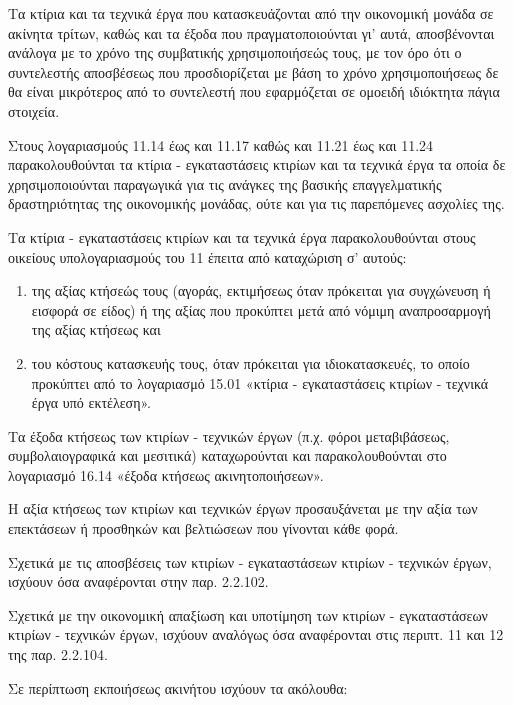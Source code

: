 \documentclass[A4,10pt,greek]{book}
\begin{document}
Τα κτίρια και τα τεχνικά έργα που κατασκευάζονται από την οικονομική μονάδα σε ακίνητα τρίτων, καθώς και τα έξοδα που πραγματοποιούνται γι' αυτά, αποσβένονται ανάλογα με το χρόνο της συμβατικής χρησιμοποιήσεώς τους, με τον όρο ότι ο συντελεστής αποσβέσεως που προσδιορίζεται με βάση το χρόνο χρησιμοποιήσεως δε θα είναι μικρότερος από το συντελεστή που εφαρμόζεται σε ομοειδή ιδιόκτητα πάγια στοιχεία.

Στους λογαριασμούς 11.14 έως και 11.17 καθώς και 11.21 έως και 11.24 παρακολουθούνται τα κτίρια - εγκαταστάσεις κτιρίων και τα τεχνικά έργα τα οποία δε χρησιμοποιούνται παραγωγικά για τις ανάγκες της βασικής επαγγελματικής δραστηριότητας της οικονομικής μονάδας, ούτε και για τις παρεπόμενες ασχολίες της.

Τα κτίρια - εγκαταστάσεις κτιρίων και τα τεχνικά έργα παρακολουθούνται στους οικείους υπολογαριασμούς του 11 έπειτα από καταχώριση σ' αυτούς:

\begin{enumerate}

\item της αξίας κτήσεώς τους (αγοράς, εκτιμήσεως όταν πρόκειται για συγχώνευση ή εισφορά σε είδος) ή της αξίας που προκύπτει μετά από νόμιμη αναπροσαρμογή της αξίας κτήσεως και 

\item του κόστους κατασκευής τους, όταν πρόκειται για ιδιοκατασκευές, το οποίο προκύπτει από το λογαριασμό 15.01 «κτίρια - εγκαταστάσεις κτιρίων - τεχνικά έργα υπό εκτέλεση».

\end{enumerate}

Τα έξοδα κτήσεως των κτιρίων - τεχνικών έργων (π.χ. φόροι μεταβιβάσεως, συμβολαιογραφικά και μεσιτικά) καταχωρούνται και παρακολουθούνται στο λογαριασμό 16.14 «έξοδα κτήσεως ακινητοποιήσεων».

Η αξία κτήσεως των κτιρίων και τεχνικών έργων προσαυξάνεται με την αξία των επεκτάσεων ή προσθηκών και βελτιώσεων που γίνονται κάθε φορά.

Σχετικά με τις αποσβέσεις των κτιρίων - εγκαταστάσεων κτιρίων - τεχνικών έργων, ισχύουν όσα αναφέρονται στην παρ. 2.2.102.

Σχετικά με την οικονομική απαξίωση και υποτίμηση των κτιρίων - εγκαταστάσεων κτιρίων - τεχνικών έργων, ισχύουν αναλόγως όσα αναφέρονται στις περιπτ. 11 και 12 της παρ. 2.2.104.

Σε περίπτωση εκποιήσεως ακινήτου ισχύουν τα ακόλουθα:
\end{document}
